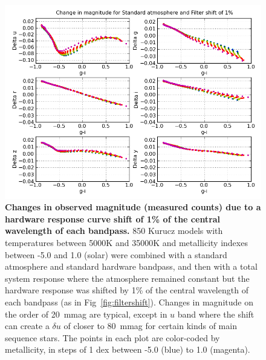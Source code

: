 \documentclass[12pt,preprint]{aastex}
\begin{document}
\begin{figure}
\centering
\includegraphics[width=6in]{delta_mags_filtershift}
\caption{{\small 
{\bf Changes in observed magnitude (measured counts)
due to a hardware response curve shift of 1\% of the central
wavelength of each bandpass.}  850 Kurucz models with temperatures
between 5000K and 35000K and metallicity indexes between -5.0 and 1.0
(solar) were combined with a standard atmosphere and standard
hardware bandpass, and then with a total system response where the
atmosphere remained constant but the hardware response was shifted by
1\% of the central wavelength of each bandpass (as in
Fig~\ref{fig:filtershift}).  Changes in magnitude on the order of
20~mmag are typical, except in $u$ band where the shift can create a
$\delta u$ of closer to 80~mmag for certain kinds of main sequence
stars. The points in each plot are color-coded by metallicity, in
steps of 1 dex between -5.0 (blue) to 1.0 (magenta).} }
\label{fig:dmag_filtershift}
\end{figure}
\end{document}
